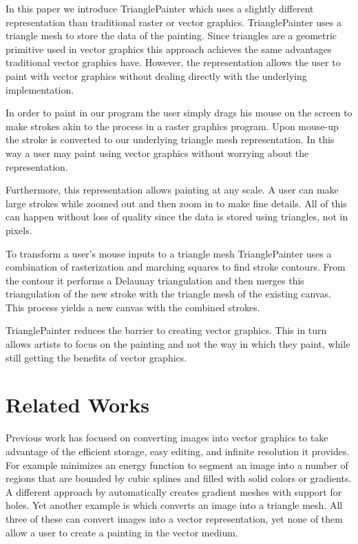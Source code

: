 \documentclass[conference]{acmsiggraph}
\begin{document}
In this paper we introduce TrianglePainter which  
uses a slightly different representation than traditional raster or vector graphics.
TrianglePainter uses a triangle mesh to store the data of the painting.
Since triangles are a geometric primitive used in vector graphics this approach achieves the
same advantages traditional vector graphics have. However, the representation allows the
user to paint with vector graphics without dealing directly with the underlying implementation.

In order to paint in our program the user simply drags his mouse on the screen to make
strokes akin to the process in a raster graphics program. Upon mouse-up the stroke is
converted to our underlying triangle mesh representation. In this way a user may paint using
vector graphics without worrying about the representation.

Furthermore, this representation allows painting at any scale. A user can make large strokes
while zoomed out and then zoom in to make fine details. All of this can happen without
loss of quality since the data is stored using triangles, not in pixels.

To transform a user's mouse inputs to a triangle mesh
TrianglePainter uses a combination of rasterization and marching squares to
find stroke contours. From the contour it performs a Delaunay triangulation
and then merges this triangulation
of the new stroke with the triangle mesh of the existing canvas. This process yields
a new canvas with the combined strokes.

TrianglePainter reduces the barrier to creating vector graphics. This in turn allows 
artists to focus on the painting and not the way in which they paint, while still 
getting the benefits of vector graphics.

\section{Related Works}

Previous work has focused on converting images into vector graphics to take advantage of the
efficient storage, easy editing, and infinite resolution it provides. For example \cite{lecot:ARD:2006}
minimizes an energy function to segment an image into a number of regions that are bounded
by cubic splines and filled with solid colors or gradients. A different approach by \cite{Lai:2009:ATG:1531326.1531391} 
automatically creates gradient meshes with support for holes. Yet another example is \cite{10.1109/TVCG.2012.76} 
which converts an image into a triangle mesh. All three of these can convert images into
a vector representation, yet none of them allow a user to create a painting in the vector medium.
\end{document}
